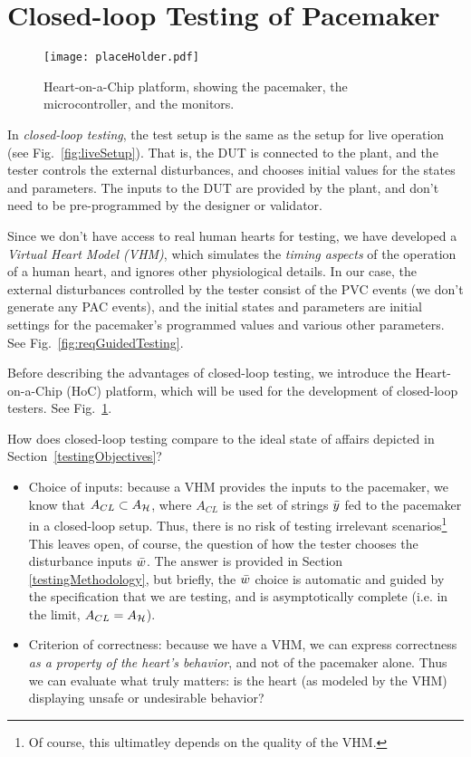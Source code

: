 \section{Closed-loop Testing of Pacemaker}
\label{closedloop}
\begin{figure}[!t]
	\centering
	\texttt{[image: placeHolder.pdf]}		
	\caption{\small Heart-on-a-Chip platform, showing the pacemaker, the microcontroller, and the monitors.}
	\label{fig:hoc}
\end{figure} 

In \emph{closed-loop testing}, the test setup is the same as the setup for live operation (see Fig.~\ref{fig:liveSetup}). 
That is, the DUT is connected to the plant, and the tester controls the external disturbances, and chooses initial values for the states and parameters.
The inputs to the DUT are provided by the plant, and don't need to be pre-programmed by the designer or validator.

Since we don't have access to real human hearts for testing, we have developed a \emph{Virtual Heart Model (VHM)}, which simulates the \emph{timing aspects} of the operation of a human heart, and ignores other physiological details.
In our case, the external disturbances controlled by the tester consist of the PVC events (we don't generate any PAC events), and the initial states and parameters are initial settings for the pacemaker's programmed values and various other parameters. 
See Fig.~\ref{fig:reqGuidedTesting}.

Before describing the advantages of closed-loop testing, we introduce the Heart-on-a-Chip (HoC) platform, which will be used for the development of closed-loop testers.
See Fig.~\ref{fig:hoc}.

How does closed-loop testing compare to the ideal state of affairs depicted in Section~\ref{testingObjectives}?
\begin{itemize}
	\item Choice of inputs: because a VHM provides the inputs to the pacemaker, we know that $A_{CL} \subset A_{\mathcal{H}}$, where $A_{CL}$ is the set of strings $\bar{y}$ fed to the pacemaker in a closed-loop setup. 
	Thus, there is no risk of testing irrelevant scenarios\footnote{Of course, this ultimatley depends on the quality of the VHM.}
	This leaves open, of course, the question of how the tester chooses the disturbance inputs $\bar{w}$. The answer is provided in Section \ref{testingMethodology}, but briefly, the $\bar{w}$ choice is automatic and guided by the specification that we are testing, and is asymptotically complete (i.e. in the limit, $A_{CL} = A_{\mathcal{H}}$).
	\item Criterion of correctness: because we have a VHM, we can express correctness \emph{as a property of the heart's behavior}, and not of the pacemaker alone. 
	Thus we can evaluate what truly matters: is the heart (as modeled by the VHM) displaying unsafe or undesirable behavior?
\end{itemize}


